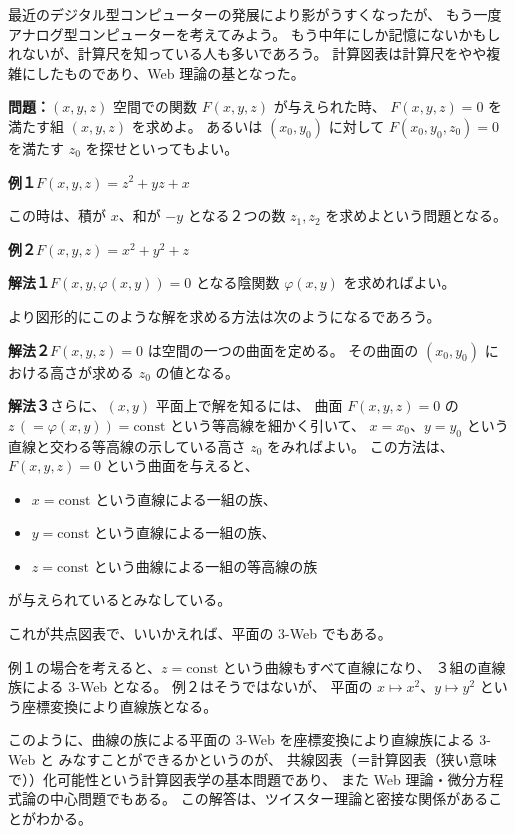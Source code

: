 \documentclass[uplatex,dvipdfmx]{jlreq}
\begin{document}
\bigskip\bigskip

最近のデジタル型コンピューターの発展により影がうすくなったが、
もう一度アナログ型コンピューターを考えてみよう。
もう中年にしか記憶にないかもしれないが、計算尺を知っている人も多いであろう。
計算図表は計算尺をやや複雑にしたものであり、Web 理論の基となった。

\bigskip

\noindent\textbf{問題：}$(x,y,z)$ 空間での関数 $F(x,y,z)$ が与えられた時、
$F(x,y,z) = 0$ を満たす組 $(x,y,z)$ を求めよ。
あるいは $(x_0, y_0)$ に対して $F(x_0, y_0, z_0) = 0$ を満たす $z_0$ を探せといってもよい。

\bigskip

\noindent\textbf{例１}\quad $F(x,y,z) = z^2 + yz + x$

この時は、積が $x$、和が $-y$ となる２つの数 $z_1, z_2$ を求めよという問題となる。

\medskip

\noindent\textbf{例２}\quad $F(x,y,z) = x^2 + y^2 + z$

\bigskip

\noindent\textbf{解法１}\quad $F(x,y,\varphi(x,y)) = 0$ となる陰関数 $\varphi(x,y)$ を求めればよい。

\medskip

より図形的にこのような解を求める方法は次のようになるであろう。

\medskip

\noindent\textbf{解法２}\quad $F(x,y,z) = 0$ は空間の一つの曲面を定める。
その曲面の $(x_0, y_0)$ における高さが求める $z_0$ の値となる。

\medskip

\noindent\textbf{解法３}\quad さらに、$(x,y)$ 平面上で解を知るには、
曲面 $F(x,y,z) = 0$ の $z\,(= \varphi(x,y)) = \mathrm{const}$ という等高線を細かく引いて、
$x = x_0$、$y = y_0$ という直線と交わる等高線の示している高さ $z_0$ をみればよい。
この方法は、$F(x,y,z) = 0$ という曲面を与えると、
\begin{itemize}
  \setlength{\itemsep}{2pt}
  \item $x = \mathrm{const}$ という直線による一組の族、
  \item $y = \mathrm{const}$ という直線による一組の族、
  \item $z = \mathrm{const}$ という曲線による一組の等高線の族
\end{itemize}
が与えられているとみなしている。

これが共点図表で、いいかえれば、平面の $3$-Web でもある。

\bigskip

例１の場合を考えると、$z = \mathrm{const}$ という曲線もすべて直線になり、
３組の直線族による $3$-Web となる。
例２はそうではないが、
平面の $x \mapsto x^2$、$y \mapsto y^2$ という座標変換により直線族となる。

\medskip

このように、曲線の族による平面の $3$-Web を座標変換により直線族による $3$-Web と
みなすことができるかというのが、
共線図表（＝計算図表（狭い意味で））化可能性という計算図表学の基本問題であり、
また Web 理論・微分方程式論の中心問題でもある。
この解答は、ツイスター理論と密接な関係があることがわかる。
\end{document}
